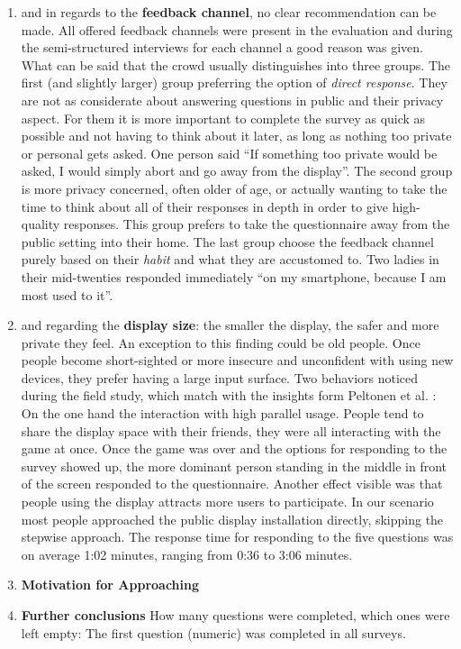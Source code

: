 \begin{enumerate}
	\item and in regards to the \textbf{feedback channel}, no clear recommendation can be made. All offered feedback channels were present in the evaluation and during the semi-structured interviews for each channel a good reason was given. What can be said that the crowd usually distinguishes into three groups. The first (and slightly larger) group preferring the option of \textit{direct response}. They are not as considerate about answering questions in public and their privacy aspect. For them it is more important to complete the survey as quick as possible and not having to think about it later, as long as nothing too private or personal gets asked. One person said ``If something too private would be asked, I would simply abort and go away from the display''. The second group is more privacy concerned, often older of age, or actually wanting to take the time to think about all of their responses in depth in order to give high-quality responses. This group prefers to take the questionnaire away from the public setting into their home. The last group choose the feedback channel purely based on their \textit{habit} and what they are accustomed to. Two ladies in their mid-twenties responded immediately ``on my smartphone, because I am most used to it''.

	\item and regarding the \textbf{display size}: the smaller the display, the safer and more private they feel. An exception to this finding could be old people. Once people become short-sighted or more insecure and unconfident with using new devices, they prefer having a large input surface.
	Two behaviors noticed during the field study, which match with the insights form Peltonen et al. \cite{peltonen2008s}: On the one hand the interaction with high parallel usage. People tend to share the display space with their friends, they were all interacting with the game at once. Once the game was over and the options for responding to the survey showed up, the more dominant person standing in the middle in front of the screen responded to the questionnaire. Another effect visible was that people using the display attracts more users to participate. In our scenario most people approached the public display installation directly, skipping the stepwise approach.
	The response time for responding to the five questions was on average 1:02 minutes, ranging from 0:36 to 3:06 minutes.



	\item \textbf{Motivation for Approaching}

	\item \textbf{Further conclusions} How many questions were completed, which ones were left empty: The first question (numeric) was completed in all surveys. 


	\end{enumerate}


